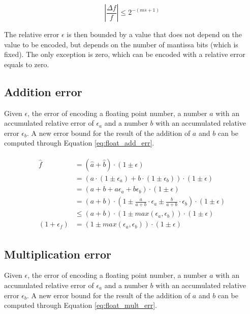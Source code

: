 \begin{equation}
	\left| \frac{\Delta f}{f} \right| \leq 2^{-(ms+1)}
	\label{eq:float_err_enc}
\end{equation}


The relative error $\epsilon$ is then bounded by a value that does not depend on the value to be encoded, but depends on the number of mantissa bits (which is fixed). The only exception is zero, which can be encoded with a relative error equals to zero.

\subsection{Addition error}
Given $\epsilon$, the error of encoding a floating point number, a number $a$ with an accumulated relative error of $\epsilon_a$ and a number $b$ with an accumulated relative error $\epsilon_b$. A new error bound for the result of the addition of $a$ and $b$ can be computed through Equation \ref{eq:float_add_err}.

\begin{align}
\begin{split}
\hat{f} &= (\hat{a} + \hat{b}) \cdot (1 \pm \epsilon)\\
		&= (a \cdot (1 \pm \epsilon_a) + b \cdot (1 \pm \epsilon_b))\cdot (1 \pm \epsilon)\\
		&= (a + b + a \epsilon_a + b \epsilon_b) \cdot (1 \pm \epsilon) \\
		&= (a + b) \cdot \left(1 \pm \frac{a}{a + b} \cdot \epsilon_a \pm \frac{b}{a+b} \cdot \epsilon_b \right) \cdot (1 \pm \epsilon) \\
		&\leq (a+b) \cdot (1 \pm max(\epsilon_a, \epsilon_b)) \cdot (1 \pm \epsilon)\\
(1+\epsilon_f) &= (1 \pm max(\epsilon_a, \epsilon_b)) \cdot (1 \pm \epsilon)
\end{split}
\label{eq:float_add_err}
\end{align}

\subsection{Multiplication error}
Given $\epsilon$, the error of encoding a floating point number, a number $a$ with an accumulated relative error of $\epsilon_a$ and a number $b$ with an accumulated relative error $\epsilon_b$. A new error bound for the result of the addition of $a$ and $b$ can be computed through Equation \ref{eq:float_mult_err}.

